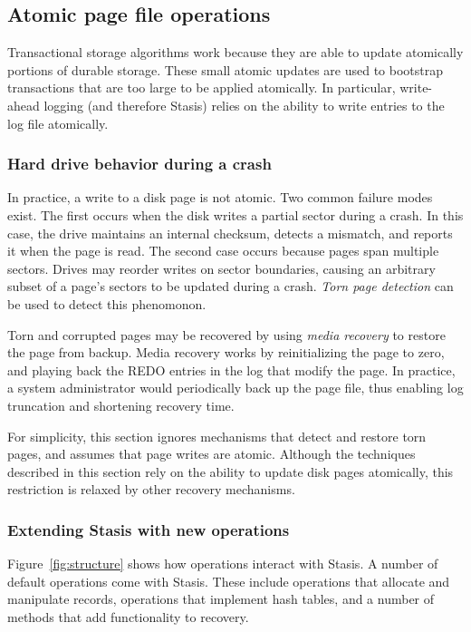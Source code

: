 \documentclass[letterpaper,twocolumn,10pt]{article}
\newcommand{\yad}{Stasis\xspace}
\begin{document}
\subsection{Atomic page file operations}

Transactional storage algorithms work because they are able to
update atomically portions of durable storage.  These small atomic
updates are used to bootstrap transactions that are too large to be
applied atomically.  In particular, write-ahead logging (and therefore
\yad) relies on the ability to write entries to the log
file atomically.

\subsubsection{Hard drive behavior during a crash}
In practice, a write to a disk page is not atomic.  Two common failure
modes exist.  The first occurs when the disk writes a partial sector
during a crash.  In this case, the drive maintains an internal
checksum, detects a mismatch, and reports it when the page is read.
The second case occurs because pages span multiple sectors.  Drives
may reorder writes on sector boundaries, causing an arbitrary subset
of a page's sectors to be updated during a crash.  {\em Torn page
detection} can be used to detect this phenomonon.

Torn
and corrupted pages may be recovered by using {\em media recovery} to
restore the page from backup.  Media recovery works by reinitializing
the page to zero, and playing back the REDO entries in the log that
modify the page.  In practice, a system administrator would
periodically back up the page file, thus enabling log truncation and
shortening recovery time.

For simplicity, this section ignores mechanisms that detect
and restore torn pages, and assumes that page writes are atomic.
Although the techniques described in this section rely on the ability to
update disk pages atomically, this restriction is relaxed by other 
recovery mechanisms.


\subsubsection{Extending \yad with new operations}

Figure~\ref{fig:structure} shows how operations interact with \yad.  A
number of default operations come with \yad.  These include operations
that allocate and manipulate records, operations that implement hash
tables, and a number of methods that add functionality to recovery.
\end{document}
